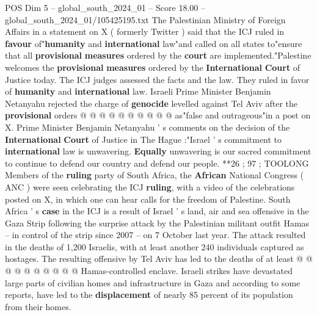 \begin{textsample}{POS Dim 5 – global\_south\_2024\_01 – Score 18.00 – global\_south\_2024\_01/105425195.txt}
The Palestinian Ministry of Foreign Affairs in a statement on X ( formerly Twitter ) said that the ICJ ruled in \textbf{favour} of"\textbf{humanity} and \textbf{international} law"and called on all states to"ensure that all \textbf{provisional} \textbf{measures} ordered by the \textbf{court} are implemented."Palestine welcomes the \textbf{provisional} \textbf{measures} ordered by the \textbf{International} \textbf{Court} of Justice today.
The ICJ judges assessed the facts and the law.
They ruled in favor of \textbf{humanity} and \textbf{international} law.
Israeli Prime Minister Benjamin Netanyahu rejected the charge of \textbf{genocide} levelled against Tel Aviv after the \textbf{provisional} orders @ @ @ @ @ @ @ @ @ @ as"false and outrageous"in a post on X.
Prime Minister Benjamin Netanyahu ' s comments on the decision of the \textbf{International} \textbf{Court} of Justice in The Hague :"Israel ' s commitment to \textbf{international} law is unwavering. \textbf{Equally} unwavering is our sacred commitment to continue to defend our country and defend our people. **26 ; 97 ; TOOLONG Members of the \textbf{ruling} party of South Africa, the \textbf{African} National Congress ( ANC ) were seen celebrating the ICJ \textbf{ruling}, with a video of the celebrations posted on X, in which one can hear calls for the freedom of Palestine.
South Africa ' s \textbf{case} in the ICJ is a result of Israel ' s land, air and sea offensive in the Gaza Strip following the surprise attack by the Palestinian militant outfit Hamas -- in control of the strip since 2007 -- on 7 October last year.
The attack resulted in the deaths of 1,200 Israelis, with at least another 240 individuals captured as hostages.
The resulting offensive by Tel Aviv has led to the deaths of at least @ @ @ @ @ @ @ @ @ @ Hamas-controlled enclave.
Israeli strikes have devastated large parts of civilian homes and infrastructure in Gaza and according to some reports, have led to the \textbf{displacement} of nearly 85 percent of its population from their homes.

\end{textsample}
